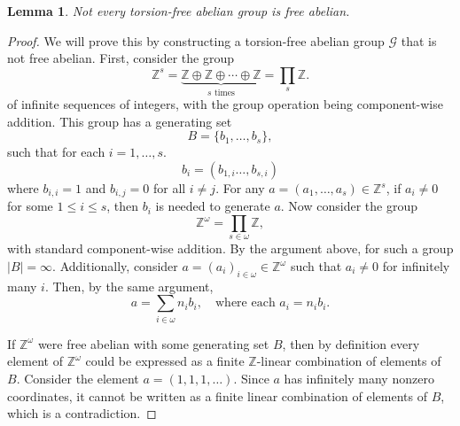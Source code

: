 \documentclass{pracalicmgr2025}
\theoremstyle{plain}            %
\newtheorem{lemma}[theorem]{Lemma}
\theoremstyle{remark}           %
\theoremstyle{definition}       %
\begin{document}
\begin{lemma}
     \label{col free abelian}
    Not every torsion-free abelian group is free abelian.
\end{lemma}
\begin{proof}
    We will prove this by constructing a torsion-free abelian group $\mathcal{G}$ that is not free abelian. First, consider the group
    \medskip
     $$
     \mathbb{Z}^s = \underbrace{\mathbb{Z} \oplus \mathbb{Z} \oplus \cdots \oplus \mathbb{Z}}_{s \text{ times}} = \prod_{s} \mathbb{Z}.
    $$
     of infinite sequences of integers, with the group operation being component-wise addition. This group has a generating set
    $$
    B = \{ b_1,\dots,b_s\},
    $$
    such that for each $i = 1,\dots,s$.
    $$b_i = (b_{1,i}\dots,b_{s,i})$$
    where $b_{i,i} = 1$ and $b_{i,j} = 0$ for all $i \ne j$. For any $a = (a_1, \dots, a_s) \in \mathbb{Z}^s$, if $a_i \ne 0$ for some $1 \le i \le s$, then $b_i$ is needed to generate $a$. Now consider the group
    $$
    \mathbb{Z}^\omega = \prod_{s \in \omega} \mathbb{Z},
    $$
    with standard component-wise addition. By the argument above, for such a group $|B| = \infty$. Additionally, consider $a = (a_i)_{i \in \omega} \in \mathbb{Z}^\omega$ such that $a_i \ne 0$ for infinitely many $i$. Then, by the same argument,
    $$
    a = \sum_{i \in \omega} n_i b_i, \quad \text{where each } a_i = n_i b_i.
    $$
    
    If $\mathbb{Z}^\omega$ were free abelian with some generating set $B$, then by definition every element of $\mathbb{Z}^\omega$ could be expressed as a finite $\mathbb{Z}$-linear combination of elements of $B$. Consider the element $a = (1,1,1,\dots)$. Since $a$ has infinitely many nonzero coordinates, it cannot be written as a finite linear combination of elements of $B$, which is a contradiction.


    \end{proof}
\end{document}
